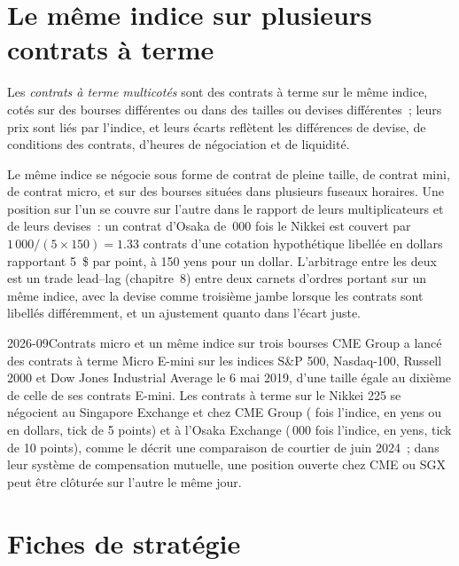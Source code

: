 \section{Le même indice sur plusieurs contrats à terme}

\begin{definition}\label{def:hf:index-and-basket-arbitrage:cross}
Les \emph{contrats à terme multicotés} sont des contrats à terme sur le même indice, cotés sur des bourses différentes ou dans des tailles ou devises différentes~;
leurs prix sont liés par l'indice, et leurs écarts reflètent les différences de devise, de conditions des contrats, d'heures de négociation et de liquidité.
\end{definition}

Le même indice se négocie sous forme de contrat de pleine taille, de contrat mini, de contrat micro, et sur des bourses situées dans plusieurs fuseaux horaires. Une position sur l'un se couvre sur l'autre dans le rapport de leurs multiplicateurs et de leurs devises~: un contrat d'Osaka de
\,000 fois le Nikkei est couvert par $1\,000/(5\times150)=1.33$ contrats d'une cotation hypothétique libellée en dollars
rapportant 5~\$ par point, à 150 yens pour un dollar. L'arbitrage entre les deux est un trade lead--lag (chapitre~8) entre deux carnets d'ordres portant sur
un même indice, avec la devise comme troisième jambe lorsque les contrats sont libellés différemment, et un ajustement quanto dans l'écart juste.

\begin{dated}{2026-09}{Contrats micro et un même indice sur trois bourses}\label{dat:hf:index-and-basket-arbitrage:listings}
CME Group a lancé des contrats à terme Micro E-mini sur les indices S\&P 500, Nasdaq-100, Russell 2000 et Dow Jones Industrial Average le 6 mai 2019, d'une taille égale au dixième
de celle de ses contrats E-mini. Les contrats à terme sur le Nikkei 225 se négocient au Singapore Exchange et chez CME Group ( fois l'indice, en yens ou en dollars,
tick de 5 points) et à l'Osaka Exchange (\,000 fois l'indice, en yens, tick de 10 points), comme le décrit une comparaison de courtier de juin 2024~;
dans leur système de compensation mutuelle, une position ouverte chez CME ou SGX peut être clôturée sur l'autre le même jour.
\end{dated}

\section{Fiches de stratégie}

